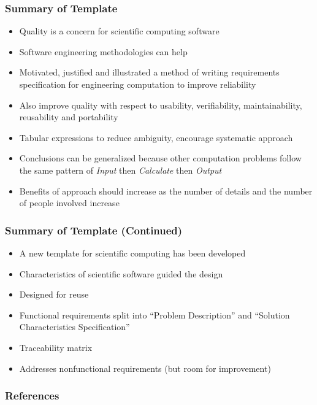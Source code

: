 \documentclass[t,12pt,numbers,fleqn]{beamer}
\begin{document}
\begin{frame}
\frametitle{Summary of Template}
\begin{itemize}
\item Quality is a concern for scientific computing software
\item Software engineering methodologies can help
\item Motivated, justified and illustrated a method of writing requirements specification for engineering computation
to improve reliability
\item Also improve quality with respect to usability, verifiability, maintainability, reusability and portability
\item Tabular expressions to reduce ambiguity, encourage systematic approach
\item Conclusions can be generalized because other computation problems follow the same pattern of \emph{Input} then
\emph{Calculate} then \emph{Output}
\item Benefits of approach should increase as the number of details and the number of people involved increase
\end{itemize}
\end{frame}


\begin{frame}
\frametitle{Summary of Template (Continued)}
\begin{itemize}
\item A new template for scientific computing has been developed
\item Characteristics of scientific software guided the design
\item Designed for reuse
\item Functional requirements split into ``Problem Description'' and ``Solution Characteristics Specification''
\item Traceability matrix
\item Addresses nonfunctional requirements (but room for improvement)
\end{itemize}

\end{frame}


\begin{frame}[allowframebreaks]
\frametitle{References}



\end{frame}

\end{document}
